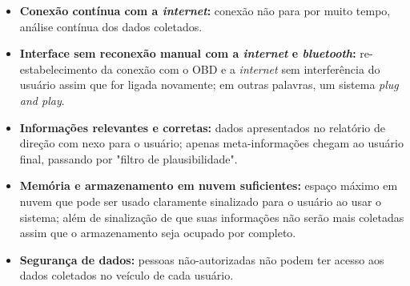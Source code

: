 \begin{itemize}
    \item \textbf{Conexão contínua com a \textit{internet}:} conexão não para por muito tempo, análise contínua dos dados coletados.
    
    
    \item \textbf{Interface sem reconexão manual com a \textit{internet} e \textit{bluetooth}:} re-estabelecimento da conexão com o OBD e a \textit{internet} sem interferência do usuário assim que for ligada novamente; em outras palavras, um sistema \textit{plug and play}.
    
    \item \textbf{Informações relevantes e corretas:} dados apresentados no relatório de direção com nexo para o usuário; apenas meta-informações chegam ao usuário final, passando por "filtro de plausibilidade".
    
    
    \item \textbf{Memória e armazenamento em nuvem suficientes:} espaço máximo em nuvem que pode ser usado claramente sinalizado para o usuário ao usar o sistema; além de sinalização de que suas informações não serão mais coletadas assim que o armazenamento seja ocupado por completo.
    
    \item \textbf{Segurança de dados:} pessoas não-autorizadas não podem ter acesso aos dados coletados no veículo de cada usuário.
\end{itemize}



